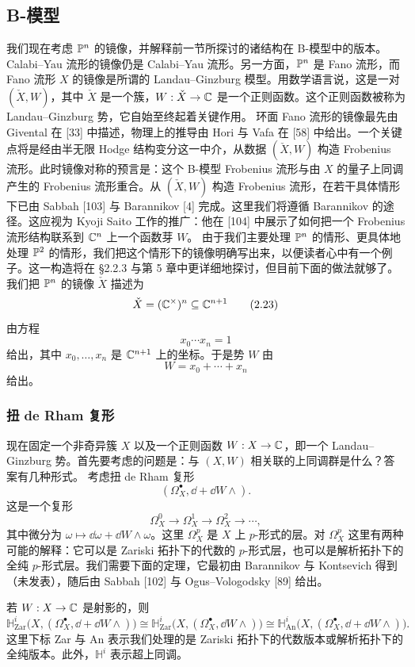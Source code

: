 \subsection{B-模型}
我们现在考虑 $\mathbb{P}^n$ 的镜像，并解释前一节所探讨的诸结构在 B-模型中的版本。
Calabi–Yau 流形的镜像仍是 Calabi–Yau 流形。另一方面，$\mathbb{P}^n$ 是 Fano 流形，而 Fano 流形 $X$ 的镜像是所谓的 Landau–Ginzburg 模型。用数学语言说，这是一对 $(\check X,W)$，其中 $\check X$ 是一个簇，$W:\check X\to\mathbb{C}$ 是一个正则函数。这个正则函数被称为 Landau–Ginzburg 势，它自始至终起着关键作用。
环面 Fano 流形的镜像最先由 Givental 在 [33] 中描述，物理上的推导由 Hori 与 Vafa 在 [58] 中给出。一个关键点将是经由半无限 Hodge 结构变分这一中介，从数据 $(\check X,W)$ 构造 Frobenius 流形。此时镜像对称的预言是：这个 B-模型 Frobenius 流形与由 $X$ 的量子上同调产生的 Frobenius 流形重合。从 $(\check X,W)$ 构造 Frobenius 流形，在若干具体情形下已由 Sabbah [103] 与 Barannikov [4] 完成。这里我们将遵循 Barannikov 的途径。这应视为 Kyoji Saito 工作的推广：他在 [104] 中展示了如何把一个 Frobenius 流形结构联系到 $\mathbb{C}^n$ 上一个函数芽 $W$。
由于我们主要处理 $\mathbb{P}^n$ 的情形、更具体地处理 $\mathbb{P}^2$ 的情形，我们把这个情形下的镜像明确写出来，以便读者心中有一个例子。这一构造将在 §2.2.3 与第 5 章中更详细地探讨，但目前下面的做法就够了。
我们把 $\mathbb{P}^n$ 的镜像 $\check X$ 描述为
\begin{equation}
\check X=(\mathbb{C}^\times)^n\subseteq\mathbb{C}^{n+1} \tag{2.23}
\end{equation}
由方程
\[
x_0\cdots x_n=1
\]
给出，其中 $x_0,\dots,x_n$ 是 $\mathbb{C}^{n+1}$ 上的坐标。于是势 $W$ 由
\[
W=x_0+\cdots+x_n
\]
给出。

\subsubsection{扭 de Rham 复形}
现在固定一个非奇异簇 $X$ 以及一个正则函数 $W:X\to\mathbb{C}$，即一个 Landau–Ginzburg 势。首先要考虑的问题是：与 $(X,W)$ 相关联的上同调群是什么？答案有几种形式。
考虑扭 de Rham 复形
\[
(\Omega^\bullet_X,\dd+\dd W\wedge).
\]
这是一个复形
\[
\Omega^0_X\to\Omega^1_X\to\Omega^2_X\to\cdots,
\]
其中微分为 $\omega\mapsto\dd\omega+\dd W\wedge\omega$。这里 $\Omega^p_X$ 是 $X$ 上 $p$-形式的层。对 $\Omega^p_X$ 这里有两种可能的解释：它可以是 Zariski 拓扑下的代数的 $p$-形式层，也可以是解析拓扑下的全纯 $p$-形式层。我们需要下面的定理，它最初由 Barannikov 与 Kontsevich 得到（未发表），随后由 Sabbah [102] 与 Ogus–Vologodsky [89] 给出。

\begin{theorem}
若 $W:X\to\mathbb{C}$ 是射影的，则
\[
\mathbb{H}^i_{\mathrm{Zar}}\bigl(X,(\Omega^\bullet_X,\dd+\dd W\wedge)\bigr)\cong\mathbb{H}^i_{\mathrm{Zar}}\bigl(X,(\Omega^\bullet_X,\dd W\wedge)\bigr)\cong\mathbb{H}^i_{\mathrm{An}}\bigl(X,(\Omega^\bullet_X,\dd+\dd W\wedge)\bigr).
\]
这里下标 Zar 与 An 表示我们处理的是 Zariski 拓扑下的代数版本或解析拓扑下的全纯版本。此外，$\mathbb{H}^i$ 表示超上同调。
\end{theorem}

